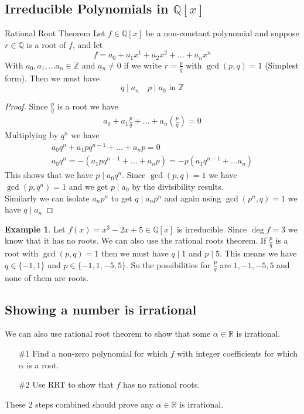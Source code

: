 \documentclass[16pt,a4paper]{article}
\theoremstyle{definition}
\newtheorem{example}{Example}
\newcommand{\Z}{\mathbb{Z}}
\newcommand{\R}{\mathbb{R}}
\newcommand{\Q}{\mathbb{Q}}
\begin{document}
\subsection{Irreducible Polynomials in $\Q[x]$}

\begin{thm}{Rational Root Theorem}{}
Let $f\in \Q[x]$ be a non-constant polynomial and suppose $r\in \Q$ is a root of $f$, and let 
\[
f = a_0 + a_1x^1 + a_2x^2 + \ldots + a_nx^n 
\]
With $a_0, a_1, \ldots a_n \in \Z$ and $a_n\neq 0$ if we write $r = \frac{p}{q}$ with $\gcd (p, q) = 1$ (Simplest form). Then we must have 
\[
q\mid a_n \quad p \mid a_0 \text{ in $\Z$}
\]
\end{thm}
\begin{proof}
Since $\frac{p}{q}$ is a root we have 
\begin{align*}
a_0 + a_1 \frac{p}{q} + \ldots + a_n \left(\frac{p}{q} \right) = 0
\end{align*}
Multiplying by $q^n$ we have 
\begin{align*}
a_0q^n + a_1pq^{n-1} + \ldots + a_np = 0 \\
a_0q^n = -(a_1pq^{n-1} + \ldots + a_np) = -p(a_1q^{n-1} + \ldots a_n)
\end{align*}
This shows that we have $p\mid a_0q^n$. Since $\gcd(p,q) = 1$ we have $\gcd(p,q^n) = 1$ and we get $p\mid a_0$ by the divisibility results. 
\\
Similarly we can isolate $a_np^n$ to get $q\mid a_np^n$ and again using $\gcd(p^n, q) = 1$ we have $q\mid a_n$
\end{proof}

\begin{example}
Let $f(x)= x^3 -2x + 5\in \Q[x]$ is irreducible.  Since $\deg f = 3$ we know that it has no roots. We can also use the rational roots theorem. If $\frac{p}{q}$ is a root with $\gcd(p,q) = 1$ then we must have $q\mid 1$ and $p\mid 5$. This means we have $q\in \{-1,1\}$ and $p\in \{-1,1,-5,5\}$. So the possibilities for $\frac p q$ are $1,-1,-5,5$ and none of them are roots. 
\end{example}
\newpage
\subsection{Showing a number is irrational}
We can also use rational root theorem to show that some $\alpha \in \R$ is irrational. 
\begin{algo}{}{}
\begin{itemize}
\item[\#1] Find a non-zero polynomial for which $f$ with integer coefficients for which $\alpha$ is a root.  
\item[\#2] Use RRT to show that $f$ has no rational roots. 
\end{itemize}
\end{algo}
These 2 steps combined should prove any $\alpha \in \R$ is irrational. 
\end{document}
